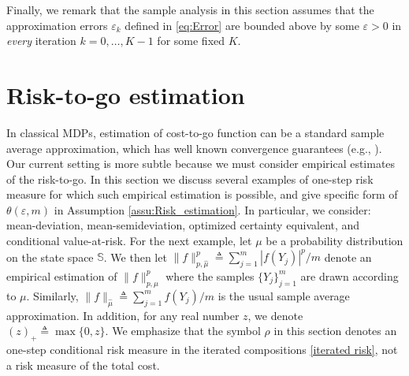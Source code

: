 \documentclass[12pt,technote,onecolumn]{IEEEtran}
\begin{document}
Finally, we remark that the sample analysis in this section assumes
that the approximation errors $\varepsilon_{k}$ defined in \eqref{eq:Error} are bounded above
by some $\varepsilon>0$ in \emph{every} iteration $k=0,\ldots,K-1$
for some fixed $K$.

\section{Risk-to-go estimation}\label{sec4}

In classical MDPs, estimation of cost-to-go function can
be a standard sample average approximation, which has well known convergence
guarantees (e.g., \cite{Haskell_EDP_2015,cooper2012performance}).
Our current setting is more subtle because we must consider empirical
estimates of the risk-to-go. In this section we discuss several examples
of one-step risk measure for which such empirical estimation is possible, and give specific
form of $\theta(\varepsilon,m)$ in Assumption \ref{assu:Risk_estimation}.
In particular, we consider: mean-deviation, mean-semideviation, optimized
certainty equivalent, and conditional value-at-risk. For
the next example, let $\mu$ be a probability distribution on the
state space $\mathbb{S}$. We then let $\|f\|_{p,\hat{\mu}}^{p}\triangleq\sum_{j=1}^{m}\left|f(Y_{j})\right|^{p}/m$
denote an empirical estimation of $\|f\|_{p,\mu}^{p}$ where the
samples $\{ Y_{j}\} _{j=1}^{m}$ are drawn according to
$\mu$. Similarly, $\|f\|_{\hat{\mu}}\triangleq\sum_{j=1}^{m}f(Y_{j})/m$
is the usual sample average approximation. In addition, for any real number $z$, we denote $(z)_+\triangleq\max\{0,z\}.$ We emphasize that the symbol $\rho$ in this section denotes an one-step conditional risk measure in the iterated compositions \eqref{iterated risk}, not a risk measure of the total cost.
\end{document}
